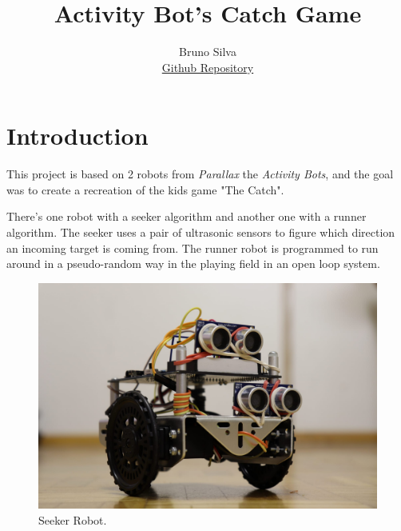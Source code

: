 \documentclass[sigconf,nonacm]{acmart}
\begin{document}
\title{Activity Bot's Catch Game}

\author{Bruno Silva \\ \href{https://github.com/brunofavs/propeller_cath_game}{Github Repository} }

    
    
    \begin{abstract}
    


    \end{abstract}
    
    \maketitle



\section{Introduction}

This project is based on 2 robots from \textit{Parallax} the \textit{Activity
Bots}, and the goal was to create a recreation of the kids game "The Catch".

There's one robot with a seeker algorithm and another one with a runner
algorithm. The seeker uses a pair of ultrasonic sensors to figure which
direction an incoming target is coming from. The runner robot is programmed to
run around in a pseudo-random way in the playing field in an open loop system.

\begin{figure}[h]
    \centering
    \includegraphics[scale=0.1]{resources/Seeker_robot/4.jpeg}
    \caption{\label{fig:Seeker}Seeker Robot.}
\end{figure}
\end{document}

